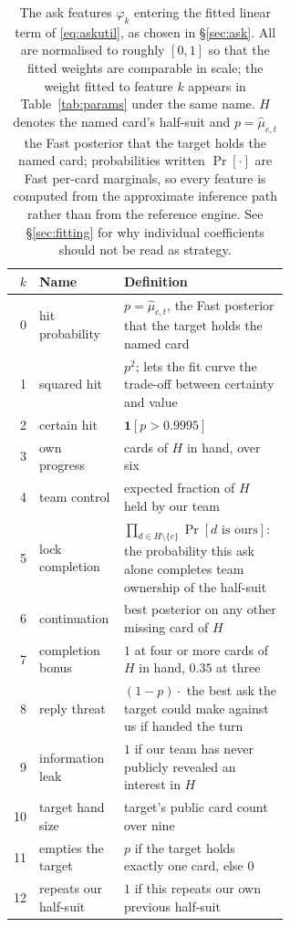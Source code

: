 \begin{table}[ht]
\centering
\caption{The \numAskFeats{} ask features $\varphi_k$ entering the fitted linear
term of \eqref{eq:askutil}, as chosen in \S\ref{sec:ask}. All are normalised to
roughly $[0,1]$ so that the fitted weights are comparable in scale; the weight
fitted to feature $k$ appears in Table~\ref{tab:params} under the same name. $H$
denotes the named card's half-suit and $p = \hat\mu_{c,t}$ the Fast posterior
that the target holds the named card; probabilities written $\Pr[\cdot]$ are Fast
per-card marginals, so every feature is computed from the approximate inference
path rather than from the reference engine. See \S\ref{sec:fitting} for why
individual coefficients should not be read as strategy.}
\label{tab:features}
\small
\begin{tabular}{rlp{0.60\linewidth}}
\toprule
$k$ & Name & Definition \\
\midrule
0  & hit probability     & $p = \hat\mu_{c,t}$, the Fast posterior that the target holds the named card \\
1  & squared hit         & $p^2$; lets the fit curve the trade-off between certainty and value \\
2  & certain hit         & $\mathbf{1}[p > 0.9995]$ \\
3  & own progress        & cards of $H$ in hand, over six \\
4  & team control        & expected fraction of $H$ held by our team \\
5  & lock completion     & $\prod_{d \in H \setminus \{c\}} \Pr[d \text{ is ours}]$: the probability this ask alone completes team ownership of the half-suit \\
6  & continuation        & best posterior on any other missing card of $H$ \\
7  & completion bonus    & $1$ at four or more cards of $H$ in hand, $0.35$ at three \\
8  & reply threat        & $(1-p)\cdot$ the best ask the target could make against us if handed the turn \\
9  & information leak    & $1$ if our team has never publicly revealed an interest in $H$ \\
10 & target hand size    & target's public card count over nine \\
11 & empties the target  & $p$ if the target holds exactly one card, else $0$ \\
12 & repeats our half-suit & $1$ if this repeats our own previous half-suit \\

\end{tabular}
\end{table}
